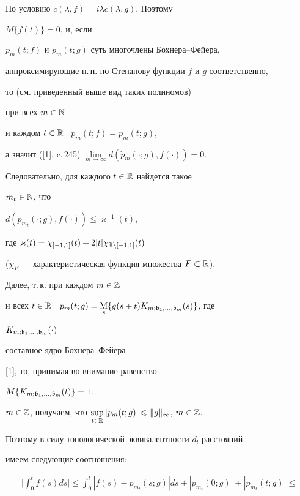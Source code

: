 \begin{pf}


По условию $c(\lambda,f)=i\lambda c(\lambda,g)$. Поэтому


$M\{f(t)\}=0$, и, если


$p_m(t;f)$ и $p_m(t;g)$ суть многочлены Бохнера--Фейера,


аппроксимирующие п.\,п. по Степанову функции $f$ и $g$ соответственно,


то (см. приведенный выше вид таких полиномов)


при всех $m\in{\Bbb N}$ 


и каждом $t\in\Bbb R$ \ $p_m(t;f)=\Dot p_m(t;g)$,


а значит ([1], c.\,245) $\lim\limits_{m\to\infty}d(\Dot


p_m(\cdot;g),f(\cdot))=0$.


Следовательно, для каждого $t\in\Bbb R$ найдется такое


$m_t\in\Bbb N$, что


$d(\Dot p_{m_t}(\cdot;g),f(\cdot))\leqslant\varkappa^{-1}(t)$,


где $\varkappa(t)=\chi_{[-1,1]}(t)+2|t|\chi_{\Bbb R\setminus[-1,1]}(t)$


($\chi_{F}$ --- характеристическая функция множества $F\subset\Bbb R$).


Далее, т.\,к. при каждом $m\in{\Bbb Z}$ 


и всех $t\in\Bbb R$ \ $p_m(t;g)=\underset{s}{\mathrm M}{}\{g(s+t)


K_{m;\frak b_1,\dotsc,\frak b_m}(s)\}$, где


$K_{m;\frak b_1,\dotsc,\frak b_m}(\cdot)$ ---


составное ядро Бохнера--Фейера


[1], то, принимая во внимание равенство 


$M\{K_{m;\frak b_1,\dotsc,\frak b_m}(t)\}=1$,


$m\in{\Bbb Z}$, получаем, что $\sup\limits_{t\in\Bbb


R}|p_m(t;g)|\leqslant\|g\|_{\infty}$, $m\in\Bbb Z$.


Поэтому в силу топологической эквивалентности $d_{l}$-расстояний


имеем следующие соотношения:


\begin{multline*}


\bigg|\int_0^t f(s)ds\bigg|\leqslant\int_0^t|f(s)


-\Dot p_{m_{t}}(s;g)|ds+|p_{m_{t}}(0;g)|+|p_{m_{t}}(t;g)|\leqslant \\



\end{multline*}
\end{pf}
